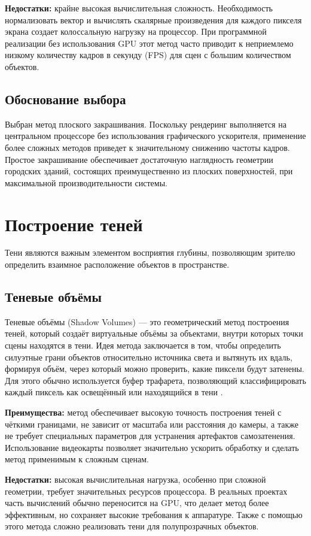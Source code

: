 \textbf{Недостатки:} крайне высокая вычислительная сложность. Необходимость нормализовать вектор и вычислять скалярные произведения для каждого пикселя экрана создает колоссальную нагрузку на процессор. При программной реализации без использования GPU этот метод часто приводит к неприемлемо низкому количеству кадров в секунду (FPS) для сцен с большим количеством объектов.

\subsection{Обоснование выбора}
Выбран метод плоского закрашивания. Поскольку рендеринг выполняется на центральном процессоре без использования графического ускорителя, применение более сложных методов приведет к значительному снижению частоты кадров. Простое закрашивание обеспечивает достаточную наглядность геометрии городских зданий, состоящих преимущественно из плоских поверхностей, при максимальной производительности системы.

\section{Построение теней}
Тени являются важным элементом восприятия глубины, позволяющим зрителю определить взаимное расположение объектов в пространстве.

\subsection{Теневые объёмы}

Теневые объёмы (Shadow Volumes) — это геометрический метод построения теней, который создаёт виртуальные объёмы за объектами, внутри которых точки сцены находятся в тени. Идея метода заключается в том, чтобы определить силуэтные грани объектов относительно источника света и вытянуть их вдаль, формируя объём, через который можно проверить, какие пиксели будут затенены. Для этого обычно используется буфер трафарета, позволяющий классифицировать каждый пиксель как освещённый или находящийся в тени \cite{ShadowVolumeCode}.  

\textbf{Преимущества:} метод обеспечивает высокую точность построения теней с чёткими границами, не зависит от масштаба или расстояния до камеры, а также не требует специальных параметров для устранения артефактов самозатенения. Использование видеокарты позволяет значительно ускорить обработку и сделать метод применимым к сложным сценам.  

\textbf{Недостатки:} высокая вычислительная нагрузка, особенно при сложной геометрии, требует значительных ресурсов процессора. В реальных проектах часть вычислений обычно переносится на GPU, что делает метод более эффективным, но сохраняет высокие требования к аппаратуре. Также с помощью этого метода сложно реализовать тени для полупрозрачных объектов.


